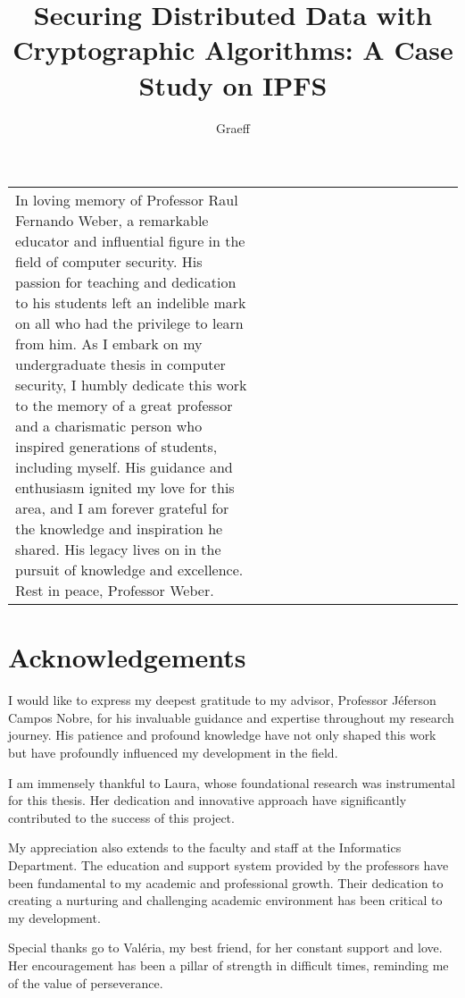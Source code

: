 \documentclass[cic,tc,english]{iiufrgs}
\title{
    Securing Distributed Data with Cryptographic Algorithms: A Case Study on 
    IPFS
}
\author{Graeff}{Felipe de Almeida}
\begin{document}
\maketitle

\clearpage
\begin{flushright}
    \mbox{}\vfill
    \begin{tabular}{p{0.55\linewidth} p{0.45\linewidth}}
        In loving memory of Professor Raul Fernando Weber, a remarkable educator and influential figure in the field of computer security. His passion for teaching and dedication to his students left an indelible mark on all who had the privilege to learn from him. As I embark on my undergraduate thesis in computer security, I humbly dedicate this work to the memory of a great professor and a charismatic person who inspired generations of students, including myself. His guidance and enthusiasm ignited my love for this area, and I am forever grateful for the knowledge and inspiration he shared. His legacy lives on in the pursuit of knowledge and excellence. Rest in peace, Professor Weber.\\
    \end{tabular}
\end{flushright}

\chapter*{Acknowledgements}
    I would like to express my deepest gratitude to my advisor, Professor 
    Jéferson Campos Nobre, for his invaluable guidance and expertise throughout 
    my research journey. His patience and profound knowledge have not only 
    shaped this work but have profoundly influenced my development in the field.

    I am immensely thankful to Laura, whose foundational research was 
    instrumental for this thesis. Her dedication and innovative approach have 
    significantly contributed to the success of this project.

    My appreciation also extends to the faculty and staff at the Informatics 
    Department. The education and support system provided by the professors have
    been fundamental to my academic and professional growth. Their dedication to
    creating a nurturing and challenging academic environment has been critical 
    to my development.

    Special thanks go to Valéria, my best friend, for her constant support and 
    love. Her encouragement has been a pillar of strength in difficult times, 
    reminding me of the value of perseverance.
\end{document}
